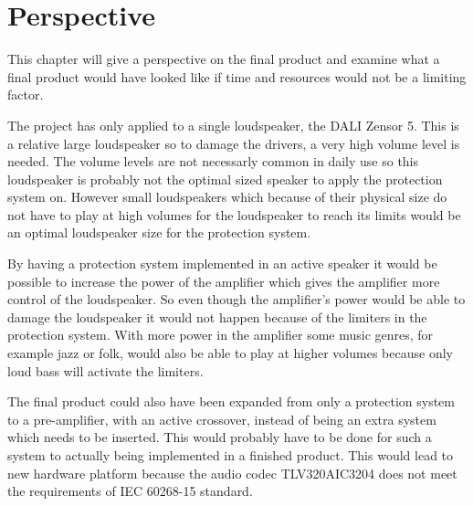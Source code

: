 \chapter{Perspective}
This chapter will give a perspective on the final product and examine what a final product would have looked like if time and resources would not be a limiting factor.

The project has only applied to a single loudspeaker, the DALI Zensor 5. This is a relative large loudspeaker so to damage the drivers, a very high volume level is needed. The volume levels are not necessarly common in daily use so this loudspeaker is probably not the optimal sized speaker to apply the protection system on. However small loudspeakers which because of their physical size do not have to play at high volumes for the loudspeaker to reach its limits would be an optimal loudspeaker size for the protection system. 

By having a protection system implemented in an active speaker it would be possible to increase the power of the amplifier which gives the amplifier more control of the loudspeaker. So even though the amplifier's power would be able to damage the loudspeaker it would not happen because of the limiters in the protection system. With more power in the amplifier some music genres, for example jazz or folk, would also be able to play at higher volumes because only loud bass will activate the limiters. 

The final product could also have been expanded from only a protection system to a pre-amplifier, with an active crossover, instead of being an extra system which needs to be inserted. This would probably have to be done for such a system to actually being implemented in a finished product. This would lead to new hardware platform because the audio codec TLV320AIC3204 does not meet the requirements of IEC 60268-15 standard.  

